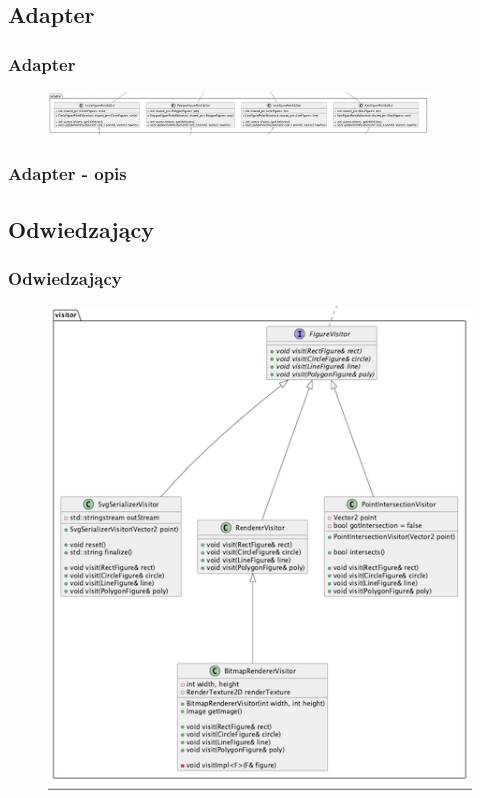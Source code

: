 \documentclass[
	11pt,]{beamer}
\begin{document}
\subsection{Adapter}

\begin{frame}
	\frametitle{Adapter}
	
	\begin{figure}
		\includegraphics[width=0.9\textwidth]{figures/adapter.png}
	\end{figure}
\end{frame}

\begin{frame}
	\frametitle{Adapter - opis}
	
\end{frame}

\subsection{Odwiedzający}

\begin{frame}
	\frametitle{Odwiedzający}
	
	\begin{figure}
		\includegraphics[height=0.7\textheight]{figures/visitor.png}
	\end{figure}
\end{frame}
\end{document}
